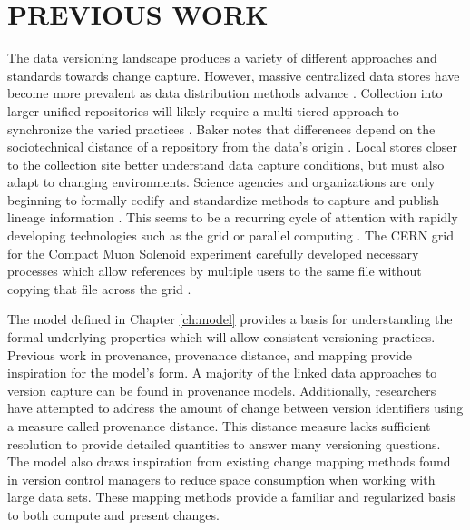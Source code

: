 
\chapter{PREVIOUS WORK}\label{ch:prevwork}

The data versioning landscape produces a variety of different approaches and standards towards change capture.
However, massive centralized data stores have become more prevalent as data distribution methods advance  \cite{Vassiliadis1999}.
Collection into larger unified repositories will likely require a multi-tiered approach to synchronize the varied practices  \cite{Baker2009}.
Baker notes that differences depend on the sociotechnical distance of a repository from the data's origin \cite{Baker2009}.
Local stores closer to the collection site better understand data capture conditions, but must also adapt to changing environments.
Science agencies and organizations are only beginning to formally codify and standardize methods to capture and publish lineage information \cite{MatthewS.Mayernik201312-039}.
This seems to be a recurring cycle of attention with rapidly developing technologies such as the grid or parallel computing \cite{Kovse2003VGridAVS}.
The CERN grid for the Compact Muon Solenoid experiment carefully developed necessary processes which allow references by multiple users to the same file without copying that file across the grid \cite{Holtman:687353}.

The model defined in Chapter \ref{ch:model} provides a basis for understanding the formal underlying properties which will allow consistent versioning practices.
Previous work in provenance, provenance distance, and mapping provide inspiration for the model's form.
A majority of the linked data approaches to version capture can be found in provenance models.
Additionally, researchers have attempted to address the amount of change between version identifiers using a measure called provenance distance.
This distance measure lacks sufficient resolution to provide detailed quantities to answer many versioning questions.
The model also draws inspiration from existing change mapping methods found in version control managers to reduce space consumption when working with large data sets.
These mapping methods provide a familiar and regularized basis to both compute and present changes.

